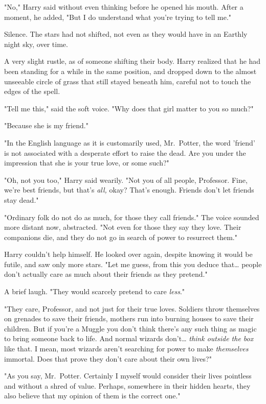 "No," Harry said without even thinking before he opened his mouth. After a 
moment, he added, "But I do understand what you're trying to tell me."

Silence. The stars had not shifted, not even as they would have in an Earthly 
night sky, over time.

A very slight rustle, as of someone shifting their body. Harry realized that he 
had been standing for a while in the same position, and dropped down to the 
almost unseeable circle of grass that still stayed beneath him, careful not to 
touch the edges of the spell.

"Tell me this," said the soft voice. "Why does that girl matter to you so much?"

"Because she is my friend."

"In the English language as it is customarily used, Mr.~Potter, the word 
'friend' is not associated with a desperate effort to raise the dead. Are you 
under the impression that she is your true love, or some such?"

"Oh, not you too," Harry said wearily. "Not you of all people, Professor. Fine, 
we're best friends, but that's \emph{all,} okay? That's enough. Friends don't 
let friends stay dead."

"Ordinary folk do not do as much, for those they call friends." The voice 
sounded more distant now, abstracted. "Not even for those they say they love. 
Their companions die, and they do not go in search of power to resurrect them."

Harry couldn't help himself. He looked over again, despite knowing it would be 
futile, and saw only more stars. "Let me guess, from this you deduce 
that{\ldots} people don't actually care as much about their friends as they 
pretend."

A brief laugh. "They would scarcely pretend to care \emph{less}."

"They care, Professor, and not just for their true loves. Soldiers throw 
themselves on grenades to save their friends, mothers run into burning houses 
to save their children. But if you're a Muggle you don't think there's any such 
thing as magic to bring someone back to life. And normal wizards don't{\ldots} 
\emph{think outside the box} like that. I mean, most wizards aren't searching 
for power to make \emph{themselves} immortal. Does that prove they don't care 
about their own lives?"

"As you say, Mr.~Potter. Certainly I myself would consider their lives 
pointless and without a shred of value. Perhaps, somewhere in their hidden 
hearts, they also believe that my opinion of them is the correct one."


